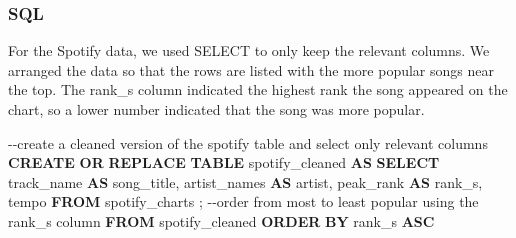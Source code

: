 \documentclass[
  letterpaper,
  DIV=11,
  numbers=noendperiod]{scrreprt}
\newenvironment{Shaded}{\begin{snugshade}}{\end{snugshade}}
\newcommand{\CommentTok}[1]{\textcolor[rgb]{0.37,0.37,0.37}{#1}}
\newcommand{\KeywordTok}[1]{\textcolor[rgb]{0.00,0.23,0.31}{\textbf{#1}}}
\newcommand{\NormalTok}[1]{\textcolor[rgb]{0.00,0.23,0.31}{#1}}
\begin{document}
\subsubsection{SQL}

For the Spotify data, we used SELECT to only keep the relevant columns.
We arranged the data so that the rows are listed with the more popular
songs near the top. The rank\_s column indicated the highest rank the
song appeared on the chart, so a lower number indicated that the song
was more popular.

\begin{Shaded}
\begin{Highlighting}[]
\CommentTok{{-}{-}create a cleaned version of the spotify table and select only relevant columns}
\KeywordTok{CREATE} \KeywordTok{OR} \KeywordTok{REPLACE} \KeywordTok{TABLE}\NormalTok{ spotify\_cleaned }\KeywordTok{AS}
  \KeywordTok{SELECT}\NormalTok{ track\_name }\KeywordTok{AS}\NormalTok{ song\_title, artist\_names }\KeywordTok{AS}\NormalTok{ artist, peak\_rank }\KeywordTok{AS}\NormalTok{ rank\_s, tempo}
  \KeywordTok{FROM}\NormalTok{ spotify\_charts}
\NormalTok{;}
\CommentTok{{-}{-}order from most to least popular using the rank\_s column}
\KeywordTok{FROM}\NormalTok{ spotify\_cleaned}
\KeywordTok{ORDER} \KeywordTok{BY}\NormalTok{ rank\_s }\KeywordTok{ASC}
\end{Highlighting}
\end{Shaded}
\end{document}
